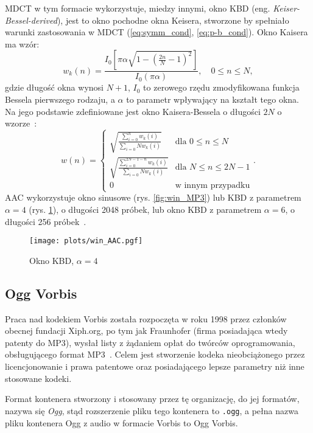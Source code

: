 \documentclass[pl,12pt]{aghdpl}
\let\Oldsubsection\subsection%
\renewcommand{\subsection}{\FloatBarrier\Oldsubsection}
\begin{document}
MDCT w tym formacie wykorzystuje, miedzy innymi, okno KBD (eng.
\textit{Keiser-Bessel-derived}), jest to okno pochodne okna Keisera, stworzone
by spełniało warunki zastosowania w MDCT (\ref{eq:symm_cond},
\ref{eq:p-b_cond}). Okno Kaisera ma wzór:
\begin{equation}\label{eq:kaiser_win}
  w_k(n) = \frac{I_0\left[\pi\alpha\sqrt{1-\left(\frac{2n}{N}-1\right)^2}\right]}
  {I_0(\pi\alpha)},\quad 0 \leq n \leq N,
\end{equation}
gdzie długość okna wynosi $N+1$, $I_0$ to zerowego rzędu zmodyfikowana funkcja
Bessela pierwszego rodzaju, a $\alpha$ to parametr wpływający na kształt tego
okna. Na jego podstawie zdefiniowane jest okno Kaisera-Bessela o długości $2N$
o wzorze~\cite{BosiGoldberg2002}:
\begin{equation}\label{eq:kbd_win}
  w(n) = \begin{cases}
    \sqrt{\frac{\sum_{i=0}^{n}w_k(i)}{\sum_{i=0}{N}w_k(i)}} & \text{dla }0 \leq n \leq N \\
    \sqrt{\frac{\sum_{i=0}^{2N-1-n}w_k(i)}{\sum_{i=0}{N}w_k(i)}} & \text{dla }N \leq n \leq 2N-1 \\
    0 & \text{w innym przypadku}
  \end{cases}.
\end{equation}
AAC wykorzystuje okno sinusowe (rys. \ref{fig:win_MP3}) lub KBD z parametrem
$\alpha = 4$ (rys.  \ref{fig:win_AAC}), o długości 2048 próbek, lub okno KBD z
parametrem $\alpha = 6$, o długości 256 próbek~\cite{KimRafii2018}.

\begin{figure}[!tbh]
  \centering
  \texttt{[image: plots/win\_AAC.pgf]}
  \caption{Okno KBD, $\alpha = 4$}
  \label{fig:win_AAC}
\end{figure}

\subsection{Ogg Vorbis}

Praca nad kodekiem Vorbis została rozpoczęta w roku 1998 przez członków obecnej
fundacji Xiph.org, po tym jak Fraunhofer (firma posiadająca wtedy patenty do
MP3), wysłał listy z żądaniem opłat do twórców oprogramowania, obsługującego
format MP3~\cite{XiphNaming}. Celem jest stworzenie kodeka nieobciążonego przez
licencjonowanie i prawa patentowe oraz posiadającego lepsze parametry niż inne
stosowane kodeki.

Format kontenera stworzony i stosowany przez tę organizację, do jej formatów,
nazywa się \textit{Ogg}, stąd rozszerzenie pliku tego kontenera to
\lstinline|.ogg|, a pełna nazwa pliku kontenera Ogg z audio w formacie Vorbis
to Ogg Vorbis.
\end{document}
